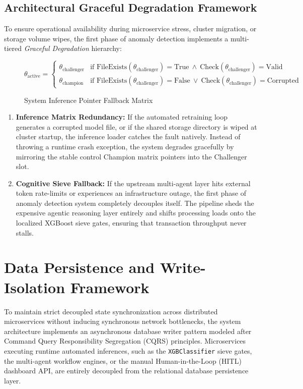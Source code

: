 \documentclass[12pt]{report}
\begin{document}
\subsection{Architectural Graceful Degradation Framework}
To ensure operational availability during microservice stress, cluster migration, or storage volume wipes, the first phase of anomaly detection implements a multi-tiered \textit{Graceful Degradation} hierarchy:

\begin{figure}[H]
    \centering
    $$
        \theta_{\text{active}} = 
        \begin{cases} 
            \theta_{\text{challenger}} & \text{if FileExists}(\theta_{\text{challenger}}) = \text{True} \ \land \ \text{Check}(\theta_{\text{challenger}}) = \text{Valid} \\
            \theta_{\text{champion}} & \text{if FileExists}(\theta_{\text{challenger}}) = \text{False} \ \lor \ \text{Check}(\theta_{\text{challenger}}) = \text{Corrupted}
        \end{cases}
    $$
    \caption{System Inference Pointer Fallback Matrix}
\end{figure}

\begin{enumerate}
    \item \textbf{Inference Matrix Redundancy:} If the automated retraining loop generates a corrupted model file, or if the shared storage directory is wiped at cluster startup, the inference loader catches the fault natively. Instead of throwing a runtime crash exception, the system degrades gracefully by mirroring the stable control Champion matrix pointers into the Challenger slot.
    \item \textbf{Cognitive Sieve Fallback:} If the upstream multi-agent layer hits external token rate-limits or experiences an infrastructure outage, the first phase of anomaly detection system completely decouples itself. The pipeline sheds the expensive agentic reasoning layer entirely and shifts processing loads onto the localized XGBoost sieve gates, ensuring that transaction throughput never stalls.
\end{enumerate}

\section{Data Persistence and Write-Isolation Framework}
To maintain strict decoupled state synchronization across distributed microservices without inducing synchronous network bottlenecks, the system architecture implements an asynchronous database writer pattern modeled after Command Query Responsibility Segregation (CQRS) principles. Microservices executing runtime automated inferences, such as the \texttt{XGBClassifier} sieve gates, the multi-agent workflow engines, or the manual Human-in-the-Loop (HITL) dashboard API, are entirely decoupled from the relational database persistence layer. 
\end{document}
